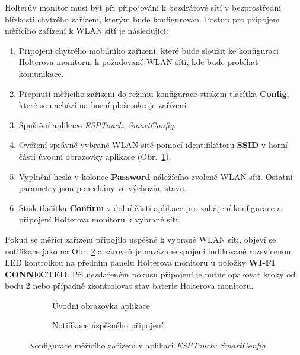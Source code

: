 Holterův monitor musí být při připojování k bezdrátové sítí v bezprostřední
blízkosti chytrého zařízení, kterým bude konfigurován. Postup pro připojení
měřícího zařízení k WLAN sítí je následující:
\begin{enumerate}
    \item Připojení chytrého mobilního zařízení, které bude sloužit ke
          konfiguraci Holterova monitoru, k požadované WLAN sítí, kde bude
          probíhat komunikace.
    \item Přepnutí měřícího zařízení do režimu konfigurace stiskem tlačítka
          \textbf{Config}, které se nachází na horní ploše okraje zařízení.
    \item Spuštění aplikace \textit{ESPTouch: SmartConfig}.
    \item Ověření správně vybrané WLAN sítě pomocí identifikátoru \textbf{SSID}
          v horní části úvodní obrazovky aplikace (Obr.~\ref{fig:app_screen1}).
    \item Vyplnění hesla v kolonce \textbf{Password} náležícího zvolené WLAN
          sítí. Ostatní parametry jsou ponechány ve výchozím stavu.
    \item Stisk tlačítka \textbf{Confirm} v dolní části aplikace pro zahájení
          konfigurace a připojení Holterova monitoru k vybrané sítí.
\end{enumerate}

Pokud se měřící zařízení připojilo úspěšně k vybrané WLAN sítí, objeví se
notifikace jako na Obr. \ref{fig:app_screen2} a zároveň je navázané spojení
indikované rozsvícenou LED kontrolkou na předním panelu Holterova monitoru u položky
\textbf{WI-FI CONNECTED}. Při nezdařeném pokusu připojení je nutné opakovat
kroky od bodu 2 nebo případně zkontrolovat stav baterie Holterova monitoru.

\begin{figure}[h]
    \centering
    \begin{subfigure}[b]{0.45\textwidth}
        \centering
        \textcolor{cyan}{\fboxrule=1.5pt\fboxsep=0pt}
        \caption{Úvodní obrazovka aplikace}
        \label{fig:app_screen1}
    \end{subfigure}
    \hfill
    \begin{subfigure}[b]{0.45\textwidth}
        \centering
        \textcolor{cyan}{\fboxrule=1.5pt\fboxsep=0pt}
        \caption{Notifikace úspěšného připojení}
        \label{fig:app_screen2}
    \end{subfigure}
    \caption{Konfigurace měřícího zařízení v aplikaci \textit{ESPTouch:
            SmartConfig}~\cite{ESPAPP}}
    \label{fig:esptouch_app}
\end{figure}

